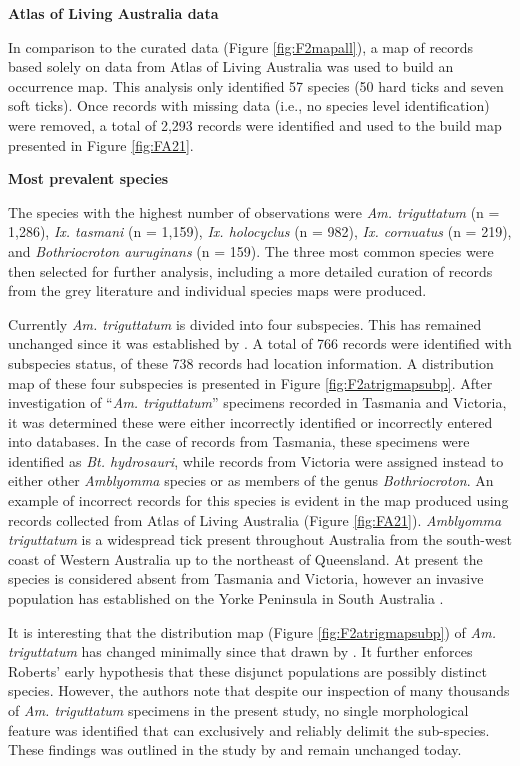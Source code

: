 \documentclass[a4paper, nobind]{templates/ociamthesis}
\begin{document}
\textbf{Atlas of Living Australia data}

In comparison to the curated data (Figure \ref{fig:F2mapall}), a map of records based solely on data from Atlas of Living Australia was used to build an occurrence map.
This analysis only identified 57 species (50 hard ticks and seven soft ticks).
Once records with missing data (i.e., no species level identification) were removed, a total of 2,293 records were identified and used to the build map presented in Figure \ref{fig:FA21}.

\textbf{Most prevalent species}

The species with the highest number of observations were \emph{Am. triguttatum} (n = 1,286), \emph{Ix. tasmani} (n = 1,159), \emph{Ix. holocyclus} (n = 982), \emph{Ix. cornuatus} (n = 219), and \emph{Bothriocroton auruginans} (n = 159).
The three most common species were then selected for further analysis, including a more detailed curation of records from the grey literature and individual species maps were produced.

Currently \emph{Am. triguttatum} is divided into four subspecies.
This has remained unchanged since it was established by \textcite{robertsStatusMorphologicallyDivergent1962}.
A total of 766 records were identified with subspecies status, of these 738 records had location information.
A distribution map of these four subspecies is presented in Figure \ref{fig:F2atrigmapsubp}.
After investigation of ``\emph{Am. triguttatum}'' specimens recorded in Tasmania and Victoria,
it was determined these were either incorrectly identified or incorrectly entered into databases.
In the case of records from Tasmania, these specimens were identified as \emph{Bt. hydrosauri}, while records from Victoria were assigned instead to either other \emph{Amblyomma} species or as members of the genus \emph{Bothriocroton}.
An example of incorrect records for this species is evident in the map produced using records collected from Atlas of Living Australia (Figure \ref{fig:FA21}).
\emph{Amblyomma triguttatum} is a widespread tick present throughout Australia from the south-west coast of Western Australia up to the northeast of Queensland.
At present the species is considered absent from Tasmania and Victoria, however an invasive population has established on the Yorke Peninsula in South Australia \autocite{mcdiarmidRangeExpansionTick2000}.

It is interesting that the distribution map (Figure \ref{fig:F2atrigmapsubp}) of \emph{Am. triguttatum} has changed minimally since that drawn by \textcite{robertsStatusMorphologicallyDivergent1962}.
It further enforces Roberts' early hypothesis that these disjunct populations are possibly distinct species.
However, the authors note that despite our inspection of many thousands of \emph{Am. triguttatum} specimens in the present study, no single morphological feature was identified that can exclusively and reliably delimit the sub-species.
These findings was outlined in the study by \textcite{robertsStatusMorphologicallyDivergent1962} and remain unchanged today.
\end{document}
